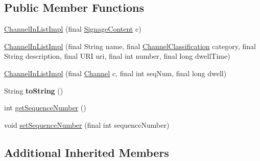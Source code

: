 \subsection*{Public Member Functions}
\begin{DoxyCompactItemize}
\item 
\hyperlink{classgov_1_1fnal_1_1ppd_1_1dd_1_1channel_1_1ChannelInListImpl_a305c35a433a166f8f3d4da96c89971b7}{Channel\-In\-List\-Impl} (final \hyperlink{interfacegov_1_1fnal_1_1ppd_1_1dd_1_1signage_1_1SignageContent}{Signage\-Content} c)
\item 
\hyperlink{classgov_1_1fnal_1_1ppd_1_1dd_1_1channel_1_1ChannelInListImpl_a7da4424fa40cba92ec8534a0925c4065}{Channel\-In\-List\-Impl} (final String name, final \hyperlink{classgov_1_1fnal_1_1ppd_1_1dd_1_1changer_1_1ChannelClassification}{Channel\-Classification} category, final String description, final U\-R\-I uri, final int number, final long dwell\-Time)
\item 
\hyperlink{classgov_1_1fnal_1_1ppd_1_1dd_1_1channel_1_1ChannelInListImpl_a8e42fcff08b52add9a348c9da75acef6}{Channel\-In\-List\-Impl} (final \hyperlink{interfacegov_1_1fnal_1_1ppd_1_1dd_1_1signage_1_1Channel}{Channel} c, final int seq\-Num, final long dwell)
\item 
\hypertarget{classgov_1_1fnal_1_1ppd_1_1dd_1_1channel_1_1ChannelInListImpl_ae7951128c28acebbdfb2c5ce5ecc9fb2}{String {\bfseries to\-String} ()}\label{classgov_1_1fnal_1_1ppd_1_1dd_1_1channel_1_1ChannelInListImpl_ae7951128c28acebbdfb2c5ce5ecc9fb2}

\item 
int \hyperlink{classgov_1_1fnal_1_1ppd_1_1dd_1_1channel_1_1ChannelInListImpl_a5e73b434e0de404051c085308bba70b9}{get\-Sequence\-Number} ()
\item 
void \hyperlink{classgov_1_1fnal_1_1ppd_1_1dd_1_1channel_1_1ChannelInListImpl_a3d7875d359431d5e2dc13b60db55cf72}{set\-Sequence\-Number} (final int sequence\-Number)
\end{DoxyCompactItemize}
\subsection*{Additional Inherited Members}


